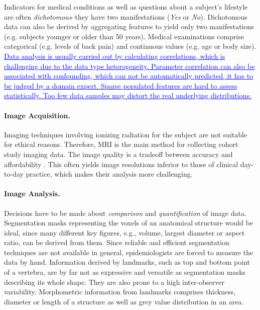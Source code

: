 \documentclass[journal]{style/vgtc} 			          %
\newcommand{\rem}[1]{\textcolor{red}{\sout{#1}}}
\newcommand{\add}[1]{\textcolor{blue}{\uline{#1}}}
\begin{document}
Indicators for medical conditions as well as questions about a subject's lifestyle are often \emph{dichotomous}--they have two manifestations (\emph{Yes} or \emph{No}).
%
Dichotomous data can also be derived by aggregating features to yield only two manifestations (e.g. subjects younger or older than 50 years).
%
Medical examinations comprise categorical (e.g. levels of back pain) and continuous values (e.g. age or body size).
%
\add{Data analysis is usually carried out by calculating correlations,
which is challenging due to the data type heterogeneity.
%
Parameter correlation can also be associated with confounding, which can not be automatically predicted, it has to be judged by a domain expert.
%
Sparse populated features are hard to assess statistically.
%
Too few data samples may distort the real underlying distributions.
}

\paragraph{Image Acquisition.} Imaging techniques involving ionizing radiation for the subject are not suitable for ethical reasons.
%
Therefore, MRI is the main method for collecting cohort study imaging data.
%
The image quality is a tradeoff between accuracy and affordability \cite{Preim2014}.
%
This often yields image resolutions inferior to those of clinical day-to-day practice, which makes their analysis more challenging.
%

\paragraph{Image Analysis.}
%
Decisions have to be made about \emph{comparison} and \emph{quantification} of image data.
%
Segmentation masks representing the voxels of an anatomical structure would be ideal, since many different key figures, e.g., volume, largest diameter or aspect ratio, can be derived from them.
%
Since reliable and efficient segmentation techniques are not available in general, epidemiologists are forced to measure the data by hand. %
%
Information derived by landmarks, such as top and bottom point of a vertebra, are by far not as expressive and versatile as segmentation masks describing its whole shape.
%
They are also prone to a high inter-observer variability.
%
%
Morphometric information from landmarks comprises thickness, diameter or length of a structure as well as grey value distribution in an area. %
\end{document}
